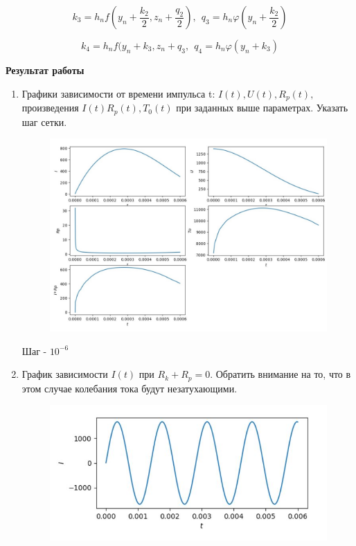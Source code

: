 \documentclass[14pt, a4paper]{extarticle}
\begin{document}
	\begin{equation*}
		k_3 = h_n f (y_n + \frac{k_2}{2}, z_n + \frac{q_2}{2}), ~~q_3 = h_n \varphi(y_n + \frac{k_2}{2})
	\end{equation*}
	
	\begin{equation*}
		k_4 = h_n f (y_n + k_3, z_n + q_3, ~~q_4 = h_n \varphi(y_n + k_3)
	\end{equation*}
	
	\newpage
	\textbf{Результат работы}
	\begin{enumerate}
		\item Графики зависимости от времени импульса t: $I(t),U(t),R_p(t),$ произведения $I(t)R_p(t), T_0(t)$ при заданных выше параметрах. Указать шаг сетки.\\
		\begin{figure}[h]
			\centering
			\includegraphics[scale=0.65]{graphics/graphs1.jpg}
		\end{figure}\par
		Шаг  - $10^{-6}$
		\newpage
		
		\item График зависимости $I(t)$ при $R_k+R_p=0$. Обратить внимание на то, что в этом случае колебания тока будут незатухающими.\\
		\begin{figure}[h]
			\centering
			\includegraphics[scale=1]{graphics/graphs2.jpg}
		\end{figure}\par
		

\end{enumerate}
\end{document}

